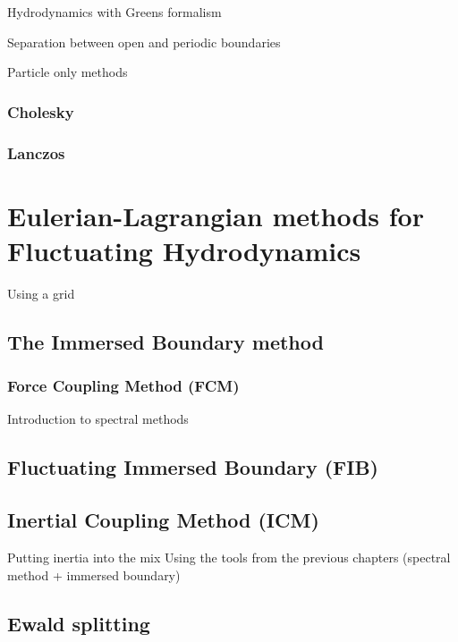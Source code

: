 \documentclass[ twoside,openright,titlepage,numbers=noenddot,%
headinclude,footinclude,cleardoublepage=empty,abstract=on,
BCOR=5mm,paper=a4,fontsize=11pt, dvipsnames
]{scrreprt}
\begin{document}
Hydrodynamics with Greens formalism

Separation between open and periodic boundaries

Particle only methods

\subsection{Cholesky}

\subsection{Lanczos}

\chapter{Eulerian-Lagrangian methods for Fluctuating Hydrodynamics}
Using a grid

\section{The Immersed Boundary method}

\subsection{Force Coupling Method (FCM)}

Introduction to spectral methods


\section{Fluctuating Immersed Boundary (FIB)}


\section{Inertial Coupling Method (ICM)}

Putting inertia into the mix
Using the tools from the previous chapters (spectral method + immersed boundary)


\section{Ewald splitting}
\end{document}
